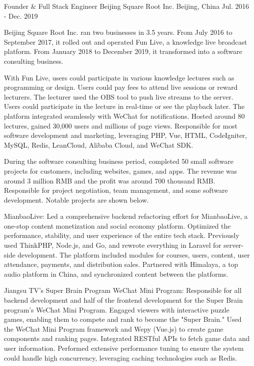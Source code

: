 \begin{cventries}
\cventry
{Founder \& Full Stack Engineer} %
{Beijing Square Root Inc.} %
{Beijing, China} %
{Jul. 2016 - Dec. 2019} %
{
  \begin{cvitems} %
    \item {Beijing Square Root Inc. ran two businesses in 3.5 years. From July 2016 to September 2017, it rolled out and operated Fun Live, a knowledge live broadcast platform. From January 2018 to December 2019, it transformed into a software consulting business.}
    \item {With Fun Live, users could participate in various knowledge lectures such as programming or design. Users could pay fees to attend live sessions or reward lecturers. The lecturer used the OBS tool to push live streams to the server. Users could participate in the lecture in real-time or see the playback later. The platform integrated seamlessly with WeChat for notifications. Hosted around 80 lectures, gained 30,000 users and millions of page views. Responsible for most software development and marketing, leveraging PHP, Vue, HTML, CodeIgniter, MySQL, Redis, LeanCloud, Alibaba Cloud, and WeChat SDK.}
    \item {During the software consulting business period, completed 50 small software projects for customers, including websites, games, and apps. The revenue was around 3 million RMB and the profit was around 700 thousand RMB. Responsible for project negotiation, team management, and some software development. Notable projects are shown below.}
    \item {MianbaoLive: Led a comprehensive backend refactoring effort for MianbaoLive, a one-stop content monetization and social economy platform. Optimized the performance, stability, and user experience of the entire tech stack. Previously used ThinkPHP, Node.js, and Go, and rewrote everything in Laravel for server-side development. The platform included modules for courses, users, content, user attendance, payments, and distribution sales. Partnered with Himalaya, a top audio platform in China, and synchronized content between the platforms.}
    \item {Jiangsu TV's Super Brain Program WeChat Mini Program: Responsible for all backend development and half of the frontend development for the Super Brain program’s WeChat Mini Program. Engaged viewers with interactive puzzle games, enabling them to compete and rank to become the "Super Brain." Used the WeChat Mini Program framework and Wepy (Vue.js) to create game components and ranking pages. Integrated RESTful APIs to fetch game data and user information. Performed extensive performance tuning to ensure the system could handle high concurrency, leveraging caching technologies such as Redis.}

\end{cvitems}}
\end{cventries}
